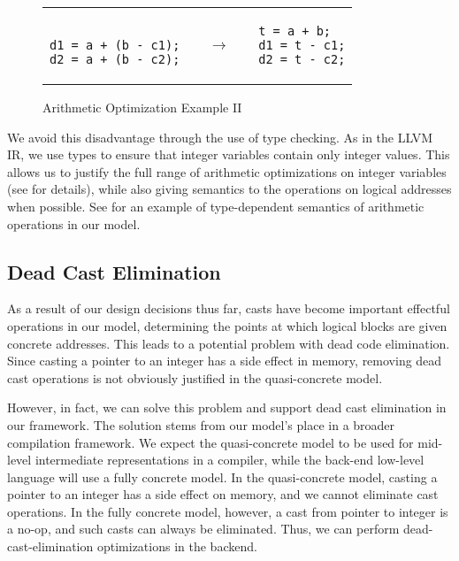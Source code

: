 \begin{figure}[t]
\center
\begin{tabular}{lll}
\begin{lstlisting}

d1 = a + (b - c1);
d2 = a + (b - c2);
\end{lstlisting}
&
$\quad\rightarrow\quad$
&
\begin{lstlisting}
t = a + b;
d1 = t - c1;
d2 = t - c2;
\end{lstlisting}
\end{tabular}
\caption{Arithmetic Optimization Example II}\label{code:arith2}
\end{figure}

We avoid this disadvantage through the use of type checking. 
As in the LLVM IR, we use types to ensure that integer variables contain only integer values.
This allows us to justify the full range of arithmetic optimizations on integer variables (see  for details), 
while also giving semantics to the operations on logical addresses when possible.
See  for an example of type-dependent semantics of arithmetic operations in our model.

\subsection{Dead Cast Elimination}
\label{idea:deadcast}

As a result of our design decisions thus far, casts have become
important effectful operations in our model, determining the points at
which logical blocks are given concrete addresses. This leads to a
potential problem with dead code elimination.  Since casting a pointer
to an integer has a side effect in memory, removing dead cast
operations is not obviously justified in the quasi-concrete model.

However, in fact,
we can solve this problem and support dead cast elimination in our
framework. 
The solution stems from our model's place in a broader compilation
framework. We expect the quasi-concrete model to be used for mid-level
intermediate representations in a compiler, while the back-end
low-level language will use a fully concrete model. In the
quasi-concrete model, casting a pointer to an integer has a side
effect on memory, and we cannot eliminate cast operations. In the
fully concrete model, however, a cast from pointer to integer is a 
no-op, and such casts can always be eliminated. Thus, we can
perform dead-cast-elimination optimizations in the backend.

